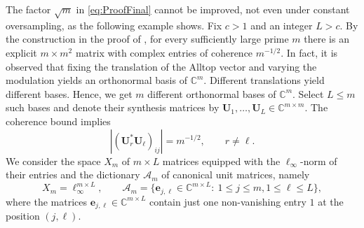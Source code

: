 \documentclass[11pt,reqno, a4paper]{article}
\numberwithin{equation}{section}
\newcommand{\C}{\mathbb{C}}
\begin{document}
The factor $\sqrt m$ in \eqref{eq:ProofFinal} cannot be improved, not even under constant oversampling, as the following example shows.
Fix \(c>1\) and an integer \(L>c\).
By the construction in the proof of \cite[Prop.~5.13]{FR13}, for every sufficiently large prime \(m\) there is an explicit \(m\times m^2\) matrix with complex entries of coherence \(m^{-1/2}\).
In fact, it is observed that fixing the translation of the Alltop vector and varying the modulation yields an orthonormal basis of $\C^m$.
Different translations yield different bases.
Hence, we get $m$ different orthonormal bases of $\C^m$.
Select \(L\leq m\) such bases and denote their synthesis matrices by \(\mathbf U_1,\ldots,\mathbf U_L\in\mathbb C^{m\times m}\).
The coherence bound implies
\begin{equation}
    \left|(\mathbf U_r^*\mathbf U_\ell)_{ij}\right|=m^{-1/2}, \qquad r\neq \ell. 
\end{equation}
We consider the space $X_m$ of $m\times L$ matrices equipped with the $\ell_\infty$-norm of their entries and the dictionary $\mathcal{A}_m$ of canonical unit matrices, namely 
\begin{equation}
    X_m=\ell_\infty^{m\times L}, \qquad \mathcal A_m=\{\mathbf e_{j,\ell}\in \mathbb{C}^{m\times L}:\ 1\leq j\leq m,1\leq\ell\leq L\}, 
\end{equation}
where the matrices $\mathbf e_{j,\ell} \in \mathbb{C}^{m\times L}$ contain just one non-vanishing entry $1$ at the position $(j,\ell)$.
\end{document}
